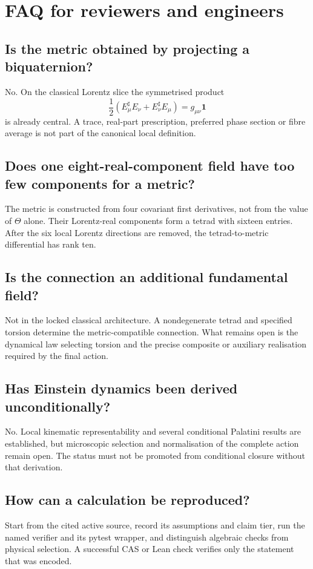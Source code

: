 
\chapter{FAQ for reviewers and engineers}

\section{Is the metric obtained by projecting a biquaternion?}
No. On the classical Lorentz slice the symmetrised product
\[
 \frac12(E_\mu^\sharp E_\nu+E_\nu^\sharp E_\mu)
 =g_{\mu\nu}\mathbf1
\]
is already central. A trace, real-part prescription, preferred phase section
or fibre average is not part of the canonical local definition.

\section{Does one eight-real-component field have too few components for a metric?}
The metric is constructed from four covariant first derivatives, not from the
value of $\Theta$ alone. Their Lorentz-real components form a tetrad with
sixteen entries. After the six local Lorentz directions are removed, the
tetrad-to-metric differential has rank ten.

\section{Is the connection an additional fundamental field?}
Not in the locked classical architecture. A nondegenerate tetrad and specified
torsion determine the metric-compatible connection. What remains open is the
dynamical law selecting torsion and the precise composite or auxiliary
realisation required by the final action.

\section{Has Einstein dynamics been derived unconditionally?}
No. Local kinematic representability and several conditional Palatini results
are established, but microscopic selection and normalisation of the complete
action remain open. The status must not be promoted from conditional closure
without that derivation.

\section{How can a calculation be reproduced?}
Start from the cited active source, record its assumptions and claim tier, run
the named verifier and its pytest wrapper, and distinguish algebraic checks
from physical selection. A successful CAS or Lean check verifies only the
statement that was encoded.
